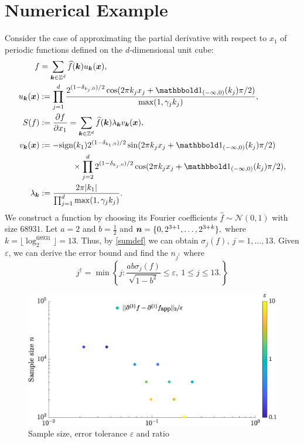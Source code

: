 \documentclass[graybox,footinfo]{svmult}
\newcommand{\DHJRabs}[1]{\ensuremath{{\left \lvert #1 \right \rvert}}}
\begin{document}
\section{Numerical Example} \label{sec:examp}

Consider the case of approximating the  partial derivative with respect to $x_1$ of periodic functions defined on the $d$-dimensional unit cube:
\begin{align*}
f &= \sum_{\bsk \in \bbZ^d} \widehat{f}(\bsk) u_{\bsk} (\bsx), \\
u_{\bsk} (\bsx) &:= \prod_{j=1}^d \frac{2^{(1-\delta_{k_j,0})/2}\cos(2\pi k_j x_j  + \bbone_{(-\infty,0)}(k_j) \pi/2 )}{\max(1,\gamma_j k_j)},  \\
S(f) &: = \frac{\partial f}{\partial x_1} = \sum_{\bsk \in \bbZ^d} \widehat{f}(\bsk) \lambda_{\bsk} v_{\bsk} (\bsx), \\
v_{\bsk}(\bsx) & : =  -\textup{sign}(k_1) 2^{(1-\delta_{k_1,0})/2} \sin(2\pi k_j x_j  + \bbone_{(-\infty,0)}(k_j) \pi/2 ) \\
& \qquad \qquad \times \prod_{j=2}^d 2^{(1-\delta_{k_j,0})/2} \cos(2\pi k_j x_j  + \bbone_{(-\infty,0)}(k_j) \pi/2 ), \\
\lambda_{\bsk} &:= \frac{2 \pi \DHJRabs{k_1}}{\prod_{j=1}^d\max(1,\gamma_j k_j)}.
\end{align*}
We construct a function by choosing its Fourier coefficients $\widehat{f} \sim  \mathcal{N}(0,1)$ with size $68931$.  Let $ a= 2$ and  $b=\frac{1}{2}$ and 
 ${\boldsymbol{n}} = \{0, 2^{3+1}, \ldots, 2^{3+k} \},$ where $k =\lfloor \log_2^{68931} \rfloor=13$. Thus, by \eqref{sumdef} we can obtain $\sigma_j(f), \ j = 1,\ldots, 13.$  Given $\varepsilon$, we can derive the error bound and find the $n_{j^\dagger}$ where
 \[j^{\dagger} = \min \left\{j : \frac{ab\sigma_j(f)}{\sqrt{1-b^2}}  \le \varepsilon, \ 1 \le j \le 13. \right\}\]

 \begin{figure}[ht]
 	\centering
 		\includegraphics[width =7.5 cm]{ProgramsImages/SimFourCoefErr.eps}
 	\caption{Sample size, error tolerance $\varepsilon$ and ratio \label{errfig}} %
 \end{figure}
\end{document}
